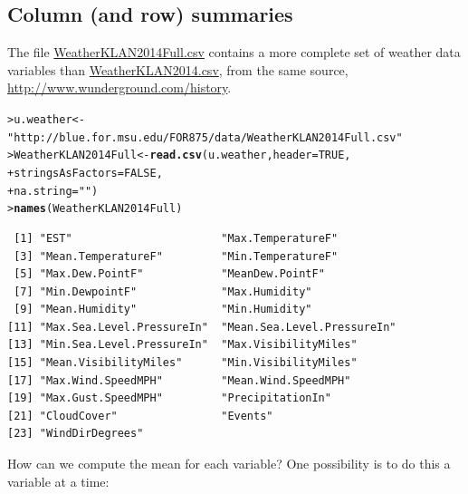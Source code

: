 \documentclass[12pt,oneside]{book}\usepackage[]{graphicx}\usepackage[]{color}
\makeatletter
\newcommand{\hlnum}[1]{\textcolor[rgb]{0.686,0.059,0.569}{#1}}%
\newcommand{\hlstr}[1]{\textcolor[rgb]{0.192,0.494,0.8}{#1}}%
\newcommand{\hlstd}[1]{\textcolor[rgb]{0.345,0.345,0.345}{#1}}%
\newcommand{\hlkwb}[1]{\textcolor[rgb]{0.69,0.353,0.396}{#1}}%
\newcommand{\hlkwc}[1]{\textcolor[rgb]{0.333,0.667,0.333}{#1}}%
\newcommand{\hlkwd}[1]{\textcolor[rgb]{0.737,0.353,0.396}{\textbf{#1}}}%
\newenvironment{kframe}{%
 \def\at@end@of@kframe{}%
 \ifinner\ifhmode%
  \def\at@end@of@kframe{\end{minipage}}%
  \begin{minipage}{\columnwidth}%
 \fi\fi%
 \def\FrameCommand##1{\hskip\@totalleftmargin \hskip-\fboxsep
 \colorbox{shadecolor}{##1}\hskip-\fboxsep
     \hskip-\linewidth \hskip-\@totalleftmargin \hskip\columnwidth}%
 \MakeFramed {\advance\hsize-\width
   \@totalleftmargin\z@ \linewidth\hsize
   \@setminipage}}%
 {\par\unskip\endMakeFramed%
 \at@end@of@kframe}
\newenvironment{knitrout}{}{} %
\makeatother
\begin{document}
\subsection{Column (and row) summaries}
The file \url{WeatherKLAN2014Full.csv} contains a more complete set of weather data variables than \url{WeatherKLAN2014.csv}, from the same source, \url{http://www.wunderground.com/history}. 
\begin{knitrout}
\color{fgcolor}\begin{kframe}
\begin{alltt}
\hlstd{> }\hlstd{u.weather} \hlkwb{<-} \hlstr{"http://blue.for.msu.edu/FOR875/data/WeatherKLAN2014Full.csv"}
\hlstd{> }\hlstd{WeatherKLAN2014Full} \hlkwb{<-} \hlkwd{read.csv}\hlstd{(u.weather,} \hlkwc{header}\hlstd{=}\hlnum{TRUE}\hlstd{,}
\hlstd{+ }                               \hlkwc{stringsAsFactors} \hlstd{=} \hlnum{FALSE}\hlstd{,}
\hlstd{+ }                               \hlkwc{na.string} \hlstd{=} \hlstr{""}\hlstd{)}
\hlstd{> }\hlkwd{names}\hlstd{(WeatherKLAN2014Full)}
\end{alltt}
\begin{verbatim}
 [1] "EST"                       "Max.TemperatureF"         
 [3] "Mean.TemperatureF"         "Min.TemperatureF"         
 [5] "Max.Dew.PointF"            "MeanDew.PointF"           
 [7] "Min.DewpointF"             "Max.Humidity"             
 [9] "Mean.Humidity"             "Min.Humidity"             
[11] "Max.Sea.Level.PressureIn"  "Mean.Sea.Level.PressureIn"
[13] "Min.Sea.Level.PressureIn"  "Max.VisibilityMiles"      
[15] "Mean.VisibilityMiles"      "Min.VisibilityMiles"      
[17] "Max.Wind.SpeedMPH"         "Mean.Wind.SpeedMPH"       
[19] "Max.Gust.SpeedMPH"         "PrecipitationIn"          
[21] "CloudCover"                "Events"                   
[23] "WindDirDegrees"           
\end{verbatim}
\end{kframe}
\end{knitrout}
How can we compute the mean for each variable? One possibility is to do this a variable at a time:
\end{document}
